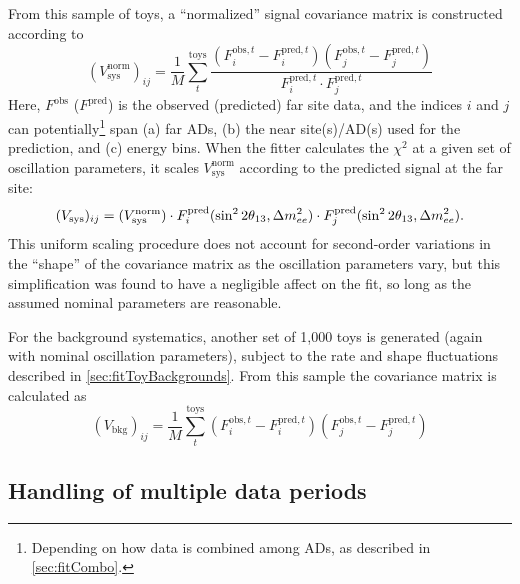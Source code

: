 \documentclass[../thesis.tex]{subfiles}
\begin{document}
From this sample of toys, a ``normalized'' signal covariance matrix is constructed according to
\begin{equation*}
  (V^{\mathrm{norm}}_{\mathrm{sys}})_{ij} = \frac{1}{M} \sum_t^{\mathrm{toys}}
  \frac{(F^{\mathrm{obs},t}_i - F^{\mathrm{pred},t}_i)(F^{\mathrm{obs},t}_j - F^{\mathrm{pred},t}_j)}%
       {F^{\mathrm{pred},t}_i \cdot F^{\mathrm{pred},t}_j}
\end{equation*}
Here, $F^{\mathrm{obs}}$ ($F^{\mathrm{pred}}$) is the observed (predicted) far site data, and the indices $i$ and $j$ can potentially\footnote{Depending on how data is combined among ADs, as described in \autoref{sec:fitCombo}.} span (a) far ADs, (b) the near site(s)/AD(s) used for the prediction, and (c) energy bins. When the fitter calculates the $\chi^2$ at a given set of oscillation parameters, it scales $V^{\mathrm{norm}}_{\mathrm{sys}}$ according to the predicted signal at the far site:
\begin{equation*}
  (V_{\mathrm{sys}})_{ij} = (V^{\mathrm{norm}}_{\mathrm{sys}}) \cdot F^{\mathrm{pred}}_i(\sin^2 2\theta_{13}, \Delta m^2_{ee})
  \cdot F^{\mathrm{pred}}_j(\sin^2 2\theta_{13}, \Delta m^2_{ee}).
\end{equation*}
This uniform scaling procedure does not account for second-order variations in the ``shape'' of the covariance matrix as the oscillation parameters vary, but this simplification was found to have a negligible affect on the fit, so long as the assumed nominal parameters are reasonable.

For the background systematics, another set of 1,000 toys is generated (again with nominal oscillation parameters), subject to the rate and shape fluctuations described in \autoref{sec:fitToyBackgrounds}. From this sample the covariance matrix is calculated as
\begin{equation*}
  (V_{\mathrm{bkg}})_{ij} = \frac{1}{M} \sum_t^{\mathrm{toys}}
  (F^{\mathrm{obs},t}_i - F^{\mathrm{pred},t}_i)(F^{\mathrm{obs},t}_j - F^{\mathrm{pred},t}_j)
\end{equation*}

\subsection{Handling of multiple data periods}
\label{sec:fitToyPeriods}
\end{document}
